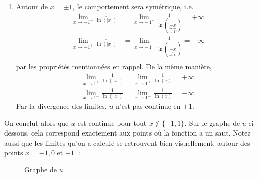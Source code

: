 \begin{exercice}[Continuité]
\begin{enumerate}
    \item Autour de $x = \pm 1$, le comportement sera symétrique, i.e.
    \begin{align*}
    \lim_{x \to -1^-} \frac{1}{\ln(|x|)} & = \lim_{x \to -1^-} \frac{1}{\ln(\underbrace{-x}_{\to 1^+})} = +\infty \\
    \lim_{x \to -1^+} \frac{1}{\ln(|x|)} & = \lim_{x \to -1^+} \frac{1}{\ln(\underbrace{-x}_{\to 1^-})} = -\infty \\
    \end{align*}
    par les propriétés mentionnées en rappel. De la même manière,
    \begin{align*}
    \lim_{x \to 1^+} \frac{1}{\ln(|x|)} = \lim_{x \to 1^+} \frac{1}{\ln(x)} = +\infty \\
    \lim_{x \to 1^-} \frac{1}{\ln(|x|)} = \lim_{x \to 1^-} \frac{1}{\ln(x)} = -\infty
    \end{align*}
    Par la divergence des limites, $u$ n'est pas continue en $\pm 1$.
\end{enumerate}
On conclut alors que $u$ est continue pour tout $x \not\in \{-1, 1\}$. Sur le graphe de $u$ ci-dessous, cela correspond exactement aux points où la fonction a un saut. Notez aussi que les limites qu'on a calculé se retrouvent bien visuellement, autour des points $x = -1, 0$ et $-1$~:
\begin{figure}[H]
    \centering
    \caption{Graphe de $u$}
    \label{fig:u_graph}
\end{figure}
\end{exercice}


